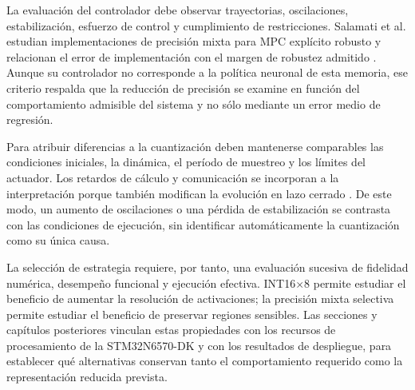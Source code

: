 La evaluación del controlador debe observar trayectorias, oscilaciones, estabilización, esfuerzo de control y cumplimiento de restricciones. Salamati et al. estudian implementaciones de precisión mixta para MPC explícito robusto y relacionan el error de implementación con el margen de robustez admitido \cite{salamati2019}. Aunque su controlador no corresponde a la política neuronal de esta memoria, ese criterio respalda que la reducción de precisión se examine en función del comportamiento admisible del sistema y no sólo mediante un error medio de regresión.

Para atribuir diferencias a la cuantización deben mantenerse comparables las condiciones iniciales, la dinámica, el período de muestreo y los límites del actuador. Los retardos de cálculo y comunicación se incorporan a la interpretación porque también modifican la evolución en lazo cerrado \cite{liberzon2009}. De este modo, un aumento de oscilaciones o una pérdida de estabilización se contrasta con las condiciones de ejecución, sin identificar automáticamente la cuantización como su única causa.

La selección de estrategia requiere, por tanto, una evaluación sucesiva de fidelidad numérica, desempeño funcional y ejecución efectiva. INT16$\times$8 permite estudiar el beneficio de aumentar la resolución de activaciones; la precisión mixta selectiva permite estudiar el beneficio de preservar regiones sensibles. Las secciones y capítulos posteriores vinculan estas propiedades con los recursos de procesamiento de la STM32N6570-DK y con los resultados de despliegue, para establecer qué alternativas conservan tanto el comportamiento requerido como la representación reducida prevista.

